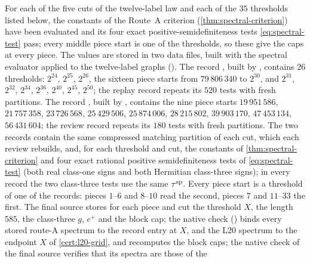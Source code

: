 \begin{certificate}\label{cert:layer12-grid}
For each of the five cuts of the twelve-label law and each of the
$35$ thresholds listed below, the constants of the Route~A
criterion (\cref{thm:spectral-criterion}) have been evaluated and
its four exact positive-semidefiniteness tests
\eqref{eq:spectral-test} pass; every middle piece start is one of
the thresholds, so these give the caps at every piece. The values
are stored in two data files, built with the spectral evaluator
 applied to the
twelve-label graphs ().
The record , built by
, contains $26$
thresholds: $2^{24}$, $2^{25}$, $2^{26}$, the sixteen piece starts from
$79\,806\,340$ to $2^{30}$, and $2^{31}$, $2^{32}$, $2^{34}$, $2^{36}$,
$2^{40}$, $2^{45}$, $2^{50}$; the replay record
 repeats its
$520$ tests with fresh partitions. The record
, built by
, contains the nine
piece starts $19\,951\,586$, $21\,757\,358$, $23\,726\,568$, $25\,429\,506$,
$25\,874\,006$, $28\,215\,802$, $39\,903\,170$, $47\,453\,134$,
$56\,431\,604$; the review record
 repeats
its $180$ tests with fresh partitions. The two records contain the same
compressed matching partition of each cut, which each review rebuilds, and,
for each threshold and cut, the constants
of \cref{thm:spectral-criterion} and four exact rational positive
semidefiniteness tests of \eqref{eq:spectral-test} (both real class-one signs
and both Hermitian class-three signs); in every record the two class-three
tests use the same $\tau^{\rm sp}$. Every piece start is a threshold of one of
the records: pieces $1$--$6$ and $8$--$10$ read the second, pieces $7$ and
$11$--$33$ the first. The final source stores for each piece and cut the
threshold $X$, the length $585$, the class-three $g$, $c^+$ and the block cap;
the native check
() binds
every stored route-A spectrum to the record entry at $X$, and the L20 spectrum
to the endpoint $X$ of \cref{cert:l20-grid}, and recomputes the block caps; the
native check of the final source verifies that its spectra are those of the

\end{certificate}
